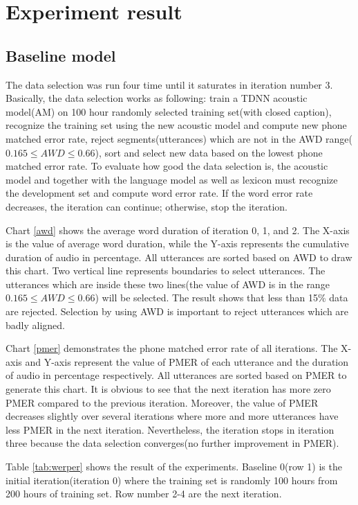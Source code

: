 \chapter{Experiment result}

\section{Baseline model}
The data selection was run four time until it saturates in iteration number 3. Basically, the data selection works as following: train a TDNN acoustic model(AM) on 100 hour randomly selected training set(with closed caption), recognize the training set using the new acoustic model and compute new phone matched error rate, reject segments(utterances) which are not in the AWD range($0.165 \leq AWD \leq 0.66$), sort and select new data based on the lowest phone matched error rate. To evaluate how good the data selection is, the acoustic model and together with the language model as well as lexicon must recognize the development set and compute word error rate. If the word error rate decreases, the iteration can continue; otherwise, stop the iteration.

Chart \ref{awd} shows the average word duration of iteration 0, 1, and 2. The X-axis is the value of average word duration, while the Y-axis represents the cumulative duration of audio in percentage. All utterances are sorted based on AWD to draw this chart. Two vertical line represents boundaries to select utterances. The utterances which are inside these two lines(the value of AWD is in the range $0.165 \leq AWD \leq 0.66$) will be selected. The result shows that less than 15\% data are rejected. Selection by using AWD is important to reject utterances which are badly aligned.

Chart  \ref{pmer} demonstrates the phone matched error rate of all iterations. The X-axis and Y-axis represent the value of PMER of each utterance and the duration of audio in percentage respectively. All utterances are sorted based on PMER to generate this chart. It is obvious to see that the next iteration has more zero PMER compared to the previous iteration. Moreover, the value of PMER decreases slightly over several iterations where more and more utterances have less PMER in the next iteration. Nevertheless, the iteration stops in iteration three because the data selection converges(no further improvement in PMER).

Table \ref{tab:werper} shows the result of the experiments. Baseline 0(row 1)  is the initial iteration(iteration 0) where the training set is randomly 100 hours from 200 hours of training set. Row number 2-4 are the next iteration. 

